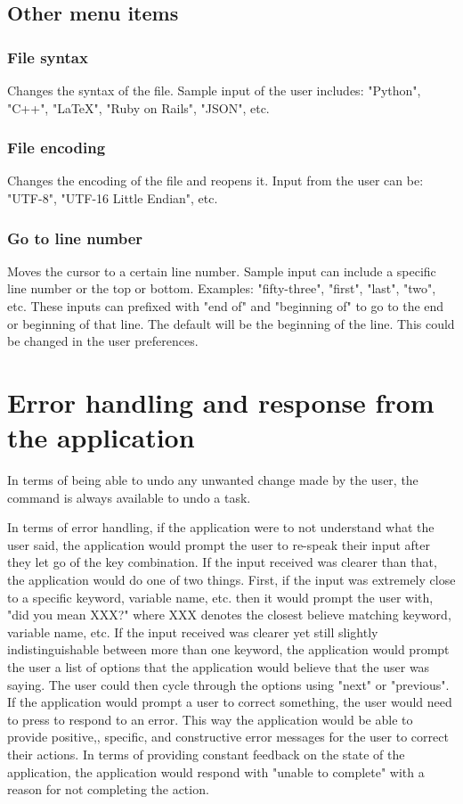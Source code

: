 \documentclass[11pt, oneside]{article}
\begin{document}
\subsection{Other menu items}

	\subsubsection{File syntax \hfill {}}
	Changes the syntax of the file. Sample input of the user includes: "Python", "C++", "\LaTeX", "Ruby on Rails", "JSON", etc.

	\subsubsection{File encoding \hfill {}}
	Changes the encoding of the file and reopens it. Input from the user can be: "UTF-8", "UTF-16 Little Endian", etc.

	\subsubsection{Go to line number \hfill {}}
	Moves the cursor to a certain line number. Sample input can include a specific line number or the top or bottom. Examples: "fifty-three", "first", "last", "two", etc. These inputs can prefixed with "end of" and "beginning of" to go to the end or beginning of that line. The default will be the beginning of the line. This could be changed in the user preferences.


\section{Error handling and response from the application}

In terms of being able to undo any unwanted change made by the user, the command  is always available to undo a task.

In terms of error handling, if the application were to not understand what the user said, the application would prompt the user to re-speak their input after they let go of the key combination. If the input received was clearer than that, the application would do one of two things. First, if the input was extremely close to a specific keyword, variable name, etc. then it would prompt the user with, "did you mean XXX?" where XXX denotes the closest believe matching keyword, variable name, etc. If the input received was clearer yet still slightly indistinguishable between more than one keyword, the application would prompt the user a list of options that the application would believe that the user was saying. The user could then cycle through the options using "next" or "previous". If the application would prompt a user to correct something, the user would need to press  to respond to an error. This way the application would be able to provide positive,, specific, and constructive error messages for the user to correct their actions. In terms of providing constant feedback on the state of the application, the application would respond with "unable to complete" with a reason for not completing the action.
\end{document}
